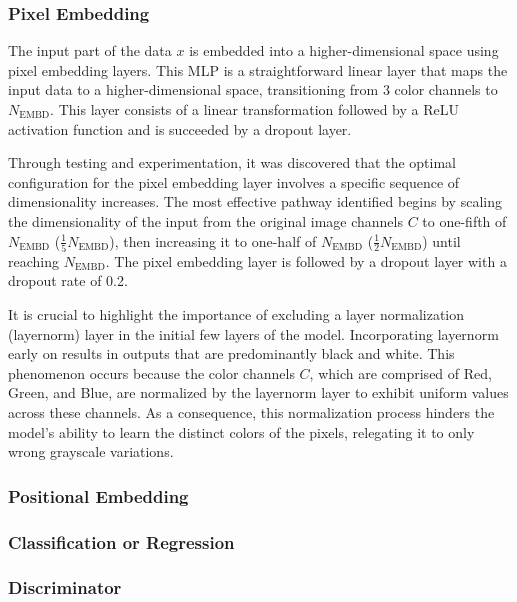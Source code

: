     \subsubsection{Pixel Embedding}

    The input part of the data \(x\) is embedded into a higher-dimensional space using pixel embedding layers. This MLP is a straightforward linear layer that maps the input data to a higher-dimensional space, transitioning from 3 color channels to \(N_{\text{EMBD}}\). This layer consists of a linear transformation followed by a ReLU activation function and is succeeded by a dropout layer.

    Through testing and experimentation, it was discovered that the optimal configuration for the pixel embedding layer involves a specific sequence of dimensionality increases. The most effective pathway identified begins by scaling the dimensionality of the input from the original image channels \(C\) to one-fifth of \(N_{\text{EMBD}}\) (\(\frac{1}{5}N_{\text{EMBD}}\)), then increasing it to one-half of \(N_{\text{EMBD}}\) (\(\frac{1}{2}N_{\text{EMBD}}\)) until reaching \(N_{\text{EMBD}}\). The pixel embedding layer is followed by a dropout layer with a dropout rate of 0.2.

    It is crucial to highlight the importance of excluding a layer normalization (layernorm) layer in the initial few layers of the model. Incorporating layernorm early on results in outputs that are predominantly black and white. This phenomenon occurs because the color channels \(C\), which are comprised of Red, Green, and Blue, are normalized by the layernorm layer to exhibit uniform values across these channels. As a consequence, this normalization process hinders the model's ability to learn the distinct colors of the pixels, relegating it to only wrong grayscale variations.

    \subsubsection{Positional Embedding}

    \subsubsection{Classification or Regression}

    \subsubsection{Discriminator}

